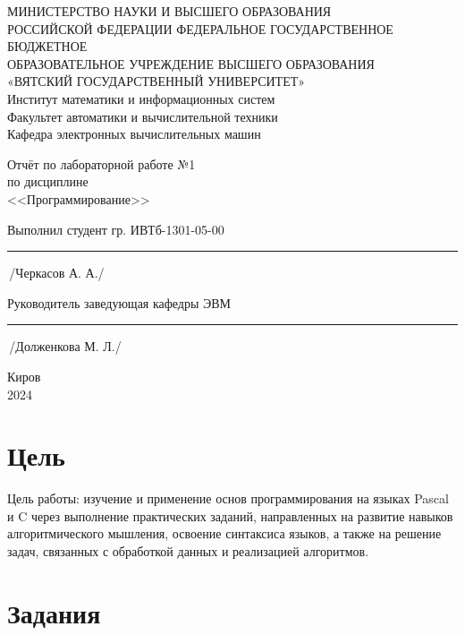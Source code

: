 \documentclass[oneside,a4paper,14pt]{extarticle}
\begin{document}
\newpage
\thispagestyle{empty}
\begin{center}
	МИНИСТЕРСТВО НАУКИ И ВЫСШЕГО ОБРАЗОВАНИЯ\\
	РОССИЙСКОЙ ФЕДЕРАЦИИ
	ФЕДЕРАЛЬНОЕ ГОСУДАРСТВЕННОЕ БЮДЖЕТНОЕ\\
	ОБРАЗОВАТЕЛЬНОЕ
	УЧРЕЖДЕНИЕ ВЫСШЕГО ОБРАЗОВАНИЯ\\
	«ВЯТСКИЙ ГОСУДАРСТВЕННЫЙ УНИВЕРСИТЕТ»\\
	Институт математики и информационных систем\\
	Факультет автоматики и вычислительной техники\\
	Кафедра электронных вычислительных машин
\end{center}
\vspace{20mm}

\begin{center}
	Отчёт по лабораторной работе №1\\
	по дисциплине\\
	<<Программирование>>\\
\end{center}
\vspace{55mm}

Выполнил студент гр. ИВТб-1301-05-00 \hspace{5mm} \rule[-0,5mm]{30mm}{0.15mm}\,/Черкасов А. А./


Руководитель заведующая кафедры ЭВМ \hfill  \rule[-0,5mm]{30mm}{0.15mm}\,/Долженкова М. Л./

\vfill
\begin{center}
	Киров\\
	2024
\end{center}

\newpage\thispagestyle{plain}

\section*{Цель}

\sloppy Цель работы: изучение и применение основ программирования на языках Pascal и C через выполнение практических заданий, направленных на развитие навыков алгоритмического мышления, освоение синтаксиса языков, а также на решение задач, связанных с обработкой данных и реализацией алгоритмов.

\section*{Задания}
\end{document}
